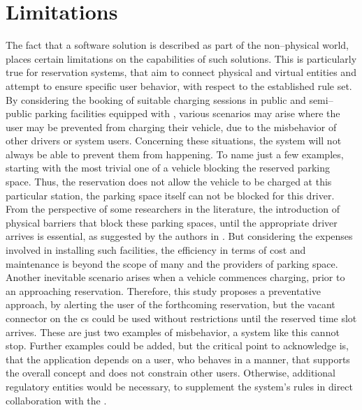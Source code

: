 \section{Limitations}
\label{ch:Analysis and Validation:sec:Limitations}

The fact that a software solution is described as part of the non--physical world, places certain limitations on the capabilities of such solutions. 
This is particularly true for reservation systems, that aim to connect physical and virtual entities and attempt to ensure specific user behavior, with respect to the established rule set.
By considering the booking of suitable charging sessions in public and semi--public parking facilities equipped with , various scenarios may arise where the user may be prevented from charging their vehicle, due to the misbehavior of other drivers or system users. 
Concerning these situations, the system will not always be able to prevent them from happening.
To name just a few examples, starting with the most trivial one of a vehicle blocking the reserved parking space. Thus, the reservation does not allow the vehicle to be charged at this particular station, the parking space itself can not be blocked for this driver.
From the perspective of some researchers in the literature, the introduction of physical barriers that block these parking spaces, until the appropriate driver arrives is essential, as suggested by the authors in \cite{basmadjian_reference_2020}.
But considering the expenses involved in installing such facilities, the efficiency in terms of cost and maintenance is beyond the scope of many  and the providers of parking space. \\
Another inevitable scenario arises when a vehicle commences charging, prior to an approaching reservation. Therefore, this study proposes a preventative approach, by alerting the user of the forthcoming reservation, but the vacant connector on the \acrshort{cs} could be used without restrictions until the reserved time slot arrives.
These are just two examples of misbehavior, a system like this cannot stop. Further examples could be added, but the critical point to acknowledge is, that the application depends on a user, who behaves in a manner, that supports the overall concept and does not constrain other users.
Otherwise, additional regulatory entities would be necessary, to supplement the system's rules in direct collaboration with the .
